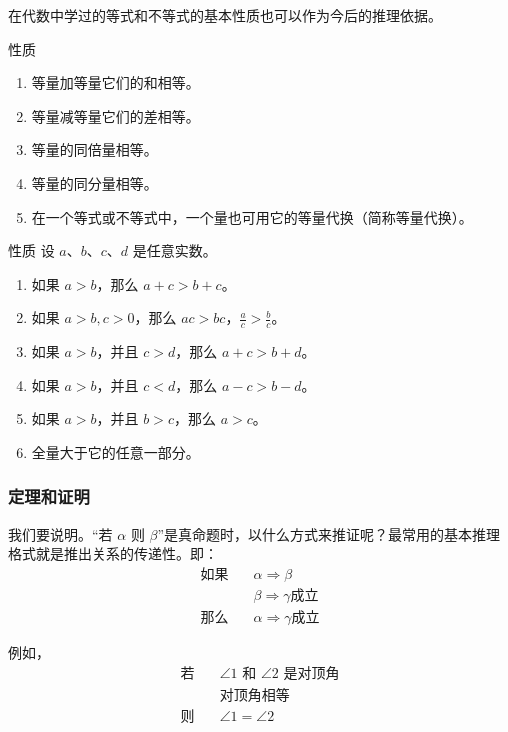 在代数中学过的等式和不等式的基本性质也可以作为今后的推理依据。
\begin{Theorem}[等量的基本性质]{性质}
\begin{enumerate}
	\item 等量加等量它们的和相等。
	\item 等量减等量它们的差相等。
	\item 等量的同倍量相等。
	\item 等量的同分量相等。
	\item 在一个等式或不等式中，一个量也可用它的等量代换（简称等量代换）。
\end{enumerate}
\end{Theorem}

\begin{Theorem}[不等量的基本性质]{性质}
	设 $a$、$b$、$c$、$d$ 是任意实数。
\begin{enumerate}
\item 如果 $a>b$，那么 $a+c>b+c$。
\item 如果 $a>b, c>0$，那么 $ac>bc$，$\frac{a}{c}>\frac{b}{c}$。
\item 如果 $a>b$，并且 $c>d$，那么 $a+c>b+d$。
\item 如果 $a>b$，并且 $c<d$，那么 $a-c>b-d$。
\item 如果 $a>b$，并且 $b>c$，那么 $a>c$。
\item 全量大于它的任意一部分。
\end{enumerate}
\end{Theorem}

\subsubsection{定理和证明}
我们要说明。“若 $\alpha$ 则 $\beta$”是真命题时，以什么方式来推证呢？最常用的基本推理格式就是推出关系的传递性。即：
\begin{align*}
	\text{如果}& \quad \alpha \Rightarrow \beta \tag{1}\\
	& \quad \beta \Rightarrow \gamma \text{成立} \tag{2}\\
\text{那么}&  \quad \alpha \Rightarrow \gamma \text{成立}\tag{3}
\end{align*}

例如，
\begin{align*}
	\text{若}& \quad \text{$\angle 1$ 和 $\angle 2$ 是对顶角} \tag{1}\\
	& \quad \text{对顶角相等} \tag{2}\\
\text{则}&  \quad \angle 1=\angle 2 \tag{3}
\end{align*}


